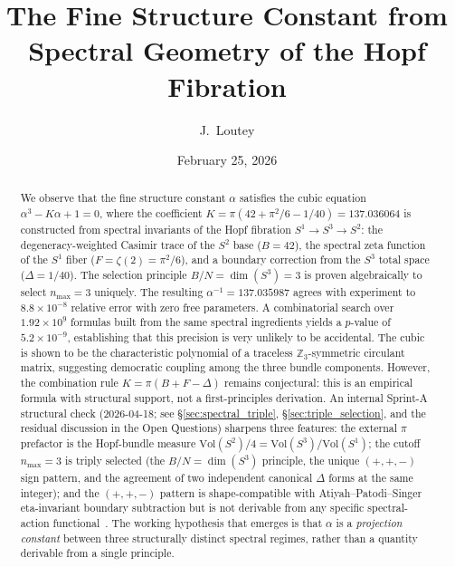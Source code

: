 \documentclass[aps,prl,twocolumn,superscriptaddress]{revtex4-2}
\begin{document}
\title{The Fine Structure Constant from Spectral Geometry of the Hopf Fibration}

\author{J.~Loutey}

\date{February 25, 2026}

\begin{abstract}
We observe that the fine structure constant $\alpha$ satisfies the cubic
equation $\alpha^3 - K\alpha + 1 = 0$, where the coefficient
$K = \pi(42 + \pi^2/6 - 1/40) = 137.036064$ is constructed from
spectral invariants of the Hopf fibration $S^1 \to S^3 \to S^2$: the
degeneracy-weighted Casimir trace of the $S^2$ base ($B = 42$), the
spectral zeta function of the $S^1$ fiber ($F = \zeta(2) = \pi^2/6$),
and a boundary correction from the $S^3$ total space
($\Delta = 1/40$). The selection principle $B/N = \dim(S^3) = 3$ is
proven algebraically to select $n_{\max} = 3$ uniquely. The resulting
$\alpha^{-1} = 137.035987$ agrees with experiment to
$8.8 \times 10^{-8}$ relative error with zero free parameters. A
combinatorial search over $1.92 \times 10^9$ formulas built from the
same spectral ingredients yields a $p$-value of
$5.2 \times 10^{-9}$, establishing that this precision is very
unlikely to be accidental. The cubic is shown to be the characteristic
polynomial of a traceless $\mathbb{Z}_3$-symmetric circulant matrix,
suggesting democratic coupling among the three bundle components.
However, the combination rule $K = \pi(B + F - \Delta)$ remains
conjectural: this is an empirical formula with structural support, not
a first-principles derivation. An internal Sprint-A structural check
(2026-04-18; see \S\ref{sec:spectral_triple}, \S\ref{sec:triple_selection},
and the residual discussion in the Open Questions) sharpens three
features: the external $\pi$ prefactor is the Hopf-bundle measure
$\mathrm{Vol}(S^2)/4 = \mathrm{Vol}(S^3)/\mathrm{Vol}(S^1)$; the cutoff
$n_{\max} = 3$ is triply selected (the $B/N = \dim(S^3)$ principle, the
unique $(+,+,-)$ sign pattern, and the agreement of two independent
canonical $\Delta$ forms at the same integer); and the $(+,+,-)$ pattern
is shape-compatible with Atiyah--Patodi--Singer eta-invariant boundary
subtraction but is not derivable from any specific
spectral-action functional~\cite{alpha_sprint_a_memo}. The working
hypothesis that emerges is that $\alpha$ is a \emph{projection constant}
between three structurally distinct spectral regimes, rather than a
quantity derivable from a single principle.
\end{abstract}
\end{document}
